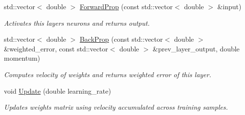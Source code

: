\begin{DoxyCompactItemize}
std\+::vector$<$ double $>$ \hyperlink{classneuralnet_1_1Layer_a0fb866c5377946f7099a820d69a0b2bd}{Forward\+Prop} (const std\+::vector$<$ double $>$ \&input)
\begin{DoxyCompactList}\small\item\em Activates this layer\textquotesingle{}s neurons and returns output. \end{DoxyCompactList}\item 
std\+::vector$<$ double $>$ \hyperlink{classneuralnet_1_1Layer_acb2410cfc113d819c545132c5df33102}{Back\+Prop} (const std\+::vector$<$ double $>$ \&weighted\+\_\+error, const std\+::vector$<$ double $>$ \&prev\+\_\+layer\+\_\+output, double momentum)
\begin{DoxyCompactList}\small\item\em Computes velocity of weights and returns weighted error of this layer. \end{DoxyCompactList}\item 
void \hyperlink{classneuralnet_1_1Layer_a98d81c554f666307c6387c9a86bb1bea}{Update} (double learning\+\_\+rate)
\begin{DoxyCompactList}\small\item\em Updates weights matrix using velocity accumulated across training samples. \end{DoxyCompactList}\end{DoxyCompactItemize}
